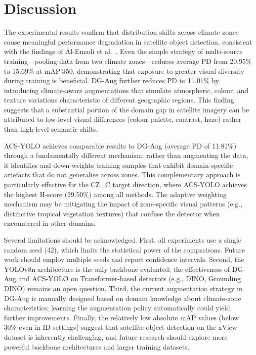 \documentclass[12pt,a4paper]{article}
\begin{document}
\section{Discussion}

The experimental results confirm that distribution shifts across climate zones cause meaningful performance degradation in satellite object detection, consistent with the findings of Al-Emadi et al.~\cite{alemadi2025rwds}. Even the simple strategy of multi-source training---pooling data from two climate zones---reduces average PD from 20.95\% to 15.69\% at mAP@50, demonstrating that exposure to greater visual diversity during training is beneficial. DG-Aug further reduces PD to 11.01\% by introducing climate-aware augmentations that simulate atmospheric, colour, and texture variations characteristic of different geographic regions. This finding suggests that a substantial portion of the domain gap in satellite imagery can be attributed to low-level visual differences (colour palette, contrast, haze) rather than high-level semantic shifts.

ACS-YOLO achieves comparable results to DG-Aug (average PD of 11.81\%) through a fundamentally different mechanism: rather than augmenting the data, it identifies and down-weights training samples that exhibit domain-specific artefacts that do not generalise across zones. This complementary approach is particularly effective for the CZ\_C target direction, where ACS-YOLO achieves the highest H-score (29.50\%) among all methods. The adaptive weighting mechanism may be mitigating the impact of zone-specific visual patterns (e.g., distinctive tropical vegetation textures) that confuse the detector when encountered in other domains.

Several limitations should be acknowledged. First, all experiments use a single random seed (42), which limits the statistical power of the comparisons. Future work should employ multiple seeds and report confidence intervals. Second, the YOLOv8n architecture is the only backbone evaluated; the effectiveness of DG-Aug and ACS-YOLO on Transformer-based detectors (e.g., DINO, Grounding DINO) remains an open question. Third, the current augmentation strategy in DG-Aug is manually designed based on domain knowledge about climate-zone characteristics; learning the augmentation policy automatically could yield further improvements. Finally, the relatively low absolute mAP values (below 30\% even in ID settings) suggest that satellite object detection on the xView dataset is inherently challenging, and future research should explore more powerful backbone architectures and larger training datasets.
\end{document}
